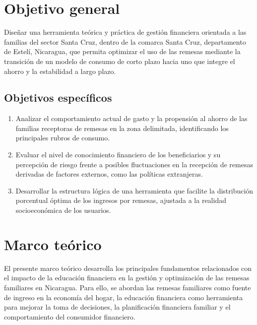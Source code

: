 \documentclass[12pt,letterpaper]{article}
\begin{document}
\section{\texorpdfstring{\textbf{Objetivo general}}{Objetivo general}}\label{objetivo-general}

Diseñar una herramienta teórica y práctica de gestión financiera orientada a las familias del sector Santa Cruz, dentro de la comarca Santa Cruz, departamento de Estelí, Nicaragua, que permita optimizar el uso de las remesas mediante la transición de un modelo de consumo de corto plazo hacia uno que integre el ahorro y la estabilidad a largo plazo.

\subsection{\texorpdfstring{\textbf{Objetivos específicos}}{Objetivos específicos}}\label{objetivos-especuxedficos}

\begin{enumerate}
\def\labelenumi{\arabic{enumi}.}
\item
  Analizar el comportamiento actual de gasto y la propensión al ahorro de las familias receptoras de remesas en la zona delimitada, identificando los principales rubros de consumo.
\item
  Evaluar el nivel de conocimiento financiero de los beneficiarios y su percepción de riesgo frente a posibles fluctuaciones en la recepción de remesas derivadas de factores externos, como las políticas extranjeras.
\item
  Desarrollar la estructura lógica de una herramienta que facilite la distribución porcentual óptima de los ingresos por remesas, ajustada a la realidad socioeconómica de los usuarios.
\end{enumerate}

\newpage
\section{\texorpdfstring{\textbf{Marco teórico}}{Marco teórico}}\label{marco-teuxf3rico}

El presente marco teórico desarrolla los principales fundamentos relacionados con el impacto de la educación financiera en la gestión y optimización de las remesas familiares en Nicaragua. Para ello, se abordan las remesas familiares como fuente de ingreso en la economía del hogar, la educación financiera como herramienta para mejorar la toma de decisiones, la planificación financiera familiar y el comportamiento del consumidor financiero.
\end{document}
